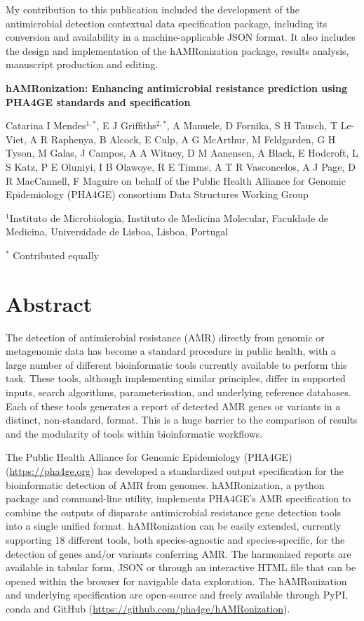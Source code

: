 My contribution to this publication included the development of the antimicrobial detection contextual data specification package, including its conversion and availability in a machine-applicable JSON format. It also includes the design and implementation of the hAMRonization package, results analysis, manuscript production and editing. 

\cleardoublepage 

\begin{center}
\large
\textbf{hAMRonization: Enhancing antimicrobial resistance  prediction using PHA4GE standards and specification}
\end{center}

Catarina I Mendes$^{1,*}$, 
E J Griffiths$^{2,*}$, 
A Manuele, 
D Fornika, 
S H Tausch, 
T Le-Viet, 
A R Raphenya, 
B Alcock, 
E Culp, 
A G McArthur, 
M Feldgarden, 
G H Tyson, 
M Galas, 
J Campos, 
A A Witney, 
D M Aanensen, 
A Black, 
E Hodcroft, 
L S Katz, 
P E Oluniyi, 
I B Olawoye, 
R E Timme, 
A T R Vasconcelos, 
A J Page, 
D R MacCannell, 
F Maguire
on behalf of the Public Health Alliance for Genomic Epidemiology (PHA4GE) consortium Data Structures Working Group

$^1$Instituto de Microbiologia, Instituto de Medicina Molecular, Faculdade de Medicina, Universidade de Lisboa, Lisboa, Portugal 

$^*$ Contributed equally 

\section{Abstract}

The detection of antimicrobial resistance (AMR) directly from genomic or metagenomic data has become a standard procedure in public health, with a large number of different bioinformatic tools currently available to perform this task. These tools, although implementing similar principles, differ in supported inputs, search algorithms, parameterisation, and underlying reference databases. Each of these tools generates a report of detected AMR genes or variants in a distinct, non-standard, format. This is a huge barrier to the comparison of results and the modularity of tools within bioinformatic workflows. 

The Public Health Alliance for Genomic Epidemiology (PHA4GE) (\url{https://pha4ge.org}) has developed a standardized output specification for the bioinformatic detection of AMR from genomes. hAMRonization, a python package and command-line utility, implements PHA4GE’s AMR specification to combine the outputs of disparate antimicrobial resistance gene detection tools into a single unified format.  hAMRonization can be easily extended, currently supporting 18 different tools, both species-agnostic and species-specific, for the detection of genes and/or variants conferring AMR. The harmonized reports are available in tabular form, JSON or through an interactive HTML file that can be opened within the browser for navigable data exploration. The hAMRonization and underlying specification are open-source and freely available through PyPI, conda and GitHub (\url{https://github.com/pha4ge/hAMRonization}).

